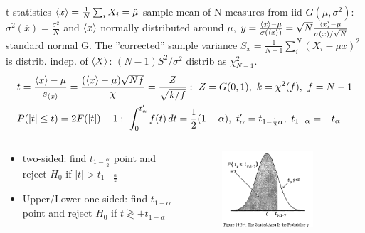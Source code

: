 \documentclass[asd-beamer.tex]{subfiles}
\begin{document}
\begin{frame}{t statistics}
$\langle x \rangle=\frac{1}{N}\sum_iX_i=\hat{\mu}$ sample mean of N measures from iid $G(\mu,\sigma^2)$: $\sigma^2(\overline{x})=\frac{\sigma^2}{N}$ and $\langle x \rangle$ normally distributed around $\mu$, $y=\frac{\langle x \rangle-\mu}{\sigma(\langle x \rangle)}=\sqrt{N}\frac{\langle x \rangle-\mu}{\sigma(x)/\sqrt{N}}$ standard normal G. The ''corrected'' sample variance $S_x=\frac{1}{N-1}\sum_i^N(X_i-\mu{x})^2$ is distrib. indep. of $\langle X \rangle$: $(N-1)S^2/\sigma^2$ distrib as $\chi^2_{N-1}$.
\begin{align*}
&t=\frac{\exv{x}-\mu}{s_{\exv{x}}}=\frac{(\exv{x}-\mu)\sqrt{Nf}}{\chi}=\frac{Z}{\sqrt{k/f}}:\ Z=G(0,1),\ k=\chi^2(f),\ f=N-1\\
&P(|t|\leq t)=2F(|t|)-1:\ \int_0^{t_{\alpha}'}f(t)\,dt=\frac{1}{2}(1-\alpha),\ t_{\alpha}'=t_{1-\frac{1}{2}\alpha},\ t_{1-\alpha}=-t_{\alpha}
\end{align*}
\begin{columns}[T]
\begin{column}{0.6\textwidth}
\begin{itemize}
	\item two-sided: find $t_{1-\frac{\alpha}{2}}$ point and reject $H_0$ if $|t|>t_{1-\frac{\alpha}{2}}$
	\item Upper/Lower one-sided: find $t_{1-\alpha}$ point and reject $H_0$ if $t\gtrless \pm t_{1-\alpha}$
\end{itemize}
\end{column}
\begin{column}{0.4\textwidth}
	\begin{figure}[!ht]\includegraphics[trim={0cm 0cm 0 0},clip, keepaspectratio,width=0.8\textwidth]{figures/mukhopadhyay/tests/studenttpercpoint}\label{fig:studenttpercpoint}
	\end{figure}
\end{column}
\end{columns}
\end{frame}
\end{document}
